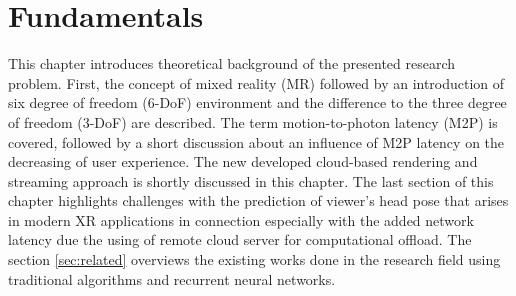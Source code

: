 
\chapter{Fundamentals}
\label{sec:theorie}
This chapter introduces theoretical background of the presented research problem. First, the concept of mixed reality (MR) followed by an introduction of six degree of freedom (6-DoF) environment and the difference to the three degree of freedom (3-DoF) are described. The term motion-to-photon latency (M2P) is covered, followed by a short discussion about an influence of M2P latency on the decreasing of user experience. The new developed cloud-based rendering and streaming approach is shortly discussed in this chapter. The last section of this chapter highlights challenges with the prediction of viewer's head pose that arises in modern XR applications in connection especially with the added network latency due the using of remote cloud server for computational offload. The section \ref{sec:related} overviews the existing works done in the research field using traditional algorithms and recurrent neural networks. 
